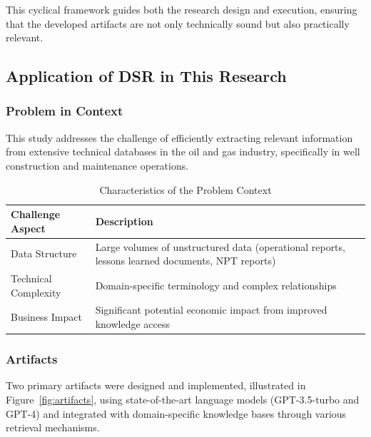        This cyclical framework guides both the research design and execution, ensuring that the developed artifacts are not only technically sound but also practically relevant.
    
    \subsection{Application of DSR in This Research}
        
        \subsubsection{Problem in Context}
        
        This study addresses the challenge of efficiently extracting relevant information from extensive technical databases in the oil and gas industry, specifically in well construction and maintenance operations. 
        
        \begin{table}[h]
            \centering
            \caption{Characteristics of the Problem Context}
            \begin{tabular}{|p{}|p{}|}
            \hline
            \textbf{Challenge Aspect} & \textbf{Description} \\
            \hline
            Data Structure & Large volumes of unstructured data (operational reports, lessons learned documents, NPT reports) \\
            \hline
            Technical Complexity & Domain-specific terminology and complex relationships \\
            \hline
            Business Impact & Significant potential economic impact from improved knowledge access \\
            \hline
            \end{tabular}
            \label{tab:problem-context}
        \end{table}
        
        \subsubsection{Artifacts}
        
        Two primary artifacts were designed and implemented, illustrated in Figure~\ref{fig:artifacts}, using state-of-the-art language models (GPT-3.5-turbo and GPT-4) and integrated with domain-specific knowledge bases through various retrieval mechanisms.
        
